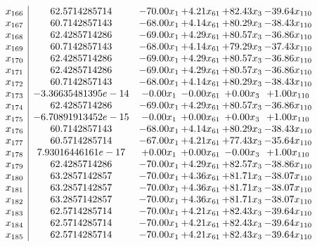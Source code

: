 \documentclass[8pt]{article}
\begin{document}
\[\begin{array}{c| c c@{\hskip 2pt} c@{\hskip 2pt} c@{\hskip 2pt} c@{\hskip 2pt} }
 x_{166}   &  62.5714285714 & -70.00 x_{1} & +  4.21 x_{61} & + 82.43 x_{3} & -39.64 x_{110}\\
 x_{167}   &  60.7142857143 & -68.00 x_{1} & +  4.14 x_{61} & + 80.29 x_{3} & -38.43 x_{110}\\
 x_{168}   &  62.4285714286 & -69.00 x_{1} & +  4.29 x_{61} & + 80.57 x_{3} & -36.86 x_{110}\\
 x_{169}   &  60.7142857143 & -68.00 x_{1} & +  4.14 x_{61} & + 79.29 x_{3} & -37.43 x_{110}\\
 x_{170}   &  62.4285714286 & -69.00 x_{1} & +  4.29 x_{61} & + 80.57 x_{3} & -36.86 x_{110}\\
 x_{171}   &  62.4285714286 & -69.00 x_{1} & +  4.29 x_{61} & + 80.57 x_{3} & -36.86 x_{110}\\
 x_{172}   &  60.7142857143 & -68.00 x_{1} & +  4.14 x_{61} & + 80.29 x_{3} & -38.43 x_{110}\\
 x_{173}   &  -3.36635481395e-14 & -0.00 x_{1} & -0.00 x_{61} & +  0.00 x_{3} & +  1.00 x_{110}\\
 x_{174}   &  62.4285714286 & -69.00 x_{1} & +  4.29 x_{61} & + 80.57 x_{3} & -36.86 x_{110}\\
 x_{175}   &  -6.70891913452e-15 & -0.00 x_{1} & +  0.00 x_{61} & +  0.00 x_{3} & +  1.00 x_{110}\\
 x_{176}   &  60.7142857143 & -68.00 x_{1} & +  4.14 x_{61} & + 80.29 x_{3} & -38.43 x_{110}\\
 x_{177}   &  60.5714285714 & -67.00 x_{1} & +  4.21 x_{61} & + 77.43 x_{3} & -35.64 x_{110}\\
 x_{178}   &  7.93016446161e-17 & +  0.00 x_{1} & +  0.00 x_{61} & -0.00 x_{3} & +  1.00 x_{110}\\
 x_{179}   &  62.4285714286 & -70.00 x_{1} & +  4.29 x_{61} & + 82.57 x_{3} & -38.86 x_{110}\\
 x_{180}   &  63.2857142857 & -70.00 x_{1} & +  4.36 x_{61} & + 81.71 x_{3} & -38.07 x_{110}\\
 x_{181}   &  63.2857142857 & -70.00 x_{1} & +  4.36 x_{61} & + 81.71 x_{3} & -38.07 x_{110}\\
 x_{182}   &  63.2857142857 & -70.00 x_{1} & +  4.36 x_{61} & + 81.71 x_{3} & -38.07 x_{110}\\
 x_{183}   &  62.5714285714 & -70.00 x_{1} & +  4.21 x_{61} & + 82.43 x_{3} & -39.64 x_{110}\\
 x_{184}   &  62.5714285714 & -70.00 x_{1} & +  4.21 x_{61} & + 82.43 x_{3} & -39.64 x_{110}\\
 x_{185}   &  62.5714285714 & -70.00 x_{1} & +  4.21 x_{61} & + 82.43 x_{3} & -39.64 x_{110}\\

\end{array}\]
\end{document}

